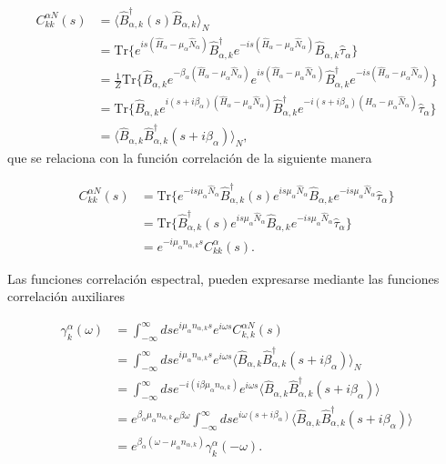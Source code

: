 \begin{appendixs}
\begin{align*}
    C^{\alpha N}_{kk}(s) & =  \langle \hat{B}^{\dagger}_{\alpha,k}(s)\hat{B}_{\alpha,k} \rangle_{N} \\
   &  = \text{Tr}\{e^{is(\hat{H}_{\alpha} - \mu_{\alpha}\hat{N}_{\alpha})}\hat{B}^{\dagger}_{\alpha,k}e^{-is(\hat{H}_{\alpha} - \mu_{\alpha}\hat{N}_{\alpha})}\hat{B}_{\alpha,k}\hat{\tau}_{\alpha}  \} \\
   & = \frac{1}{Z}\text{Tr}\{\hat{B}_{\alpha,k} e^{-\beta_{\alpha}(\hat{H}_{\alpha} - \mu_{\alpha}\hat{N}_{\alpha})} e^{is(\hat{H}_{\alpha} - \mu_{\alpha}\hat{N}_{\alpha})}\hat{B}^{\dagger}_{\alpha,k}e^{-is(\hat{H}_{\alpha} - \mu_{\alpha}\hat{N}_{\alpha})}\} \\
   & = \text{Tr}\{\hat{B}_{\alpha,k}e^{i(s+i\beta_{\alpha})(\hat{H}_{\alpha} - \mu_{\alpha}\hat{N}_{\alpha})}\hat{B}^{\dagger}_{\alpha,k}e^{-i(s+i\beta_{\alpha})(\hat{H}_{\alpha} - \mu_{\alpha}\hat{N}_{\alpha})}\hat{\tau}_{\alpha} \} \\
   & = \langle \hat{B}_{\alpha,k} \hat{B}^{\dagger}_{\alpha,k}(s+i\beta_{\alpha})\rangle_{N},
\end{align*}
que se relaciona con la función correlación de la siguiente manera 

\begin{align*}
    C^{\alpha N}_{kk}(s) & = \text{Tr}\{e^{-is\mu_{\alpha}\hat{N}_{\alpha} }\hat{B}^{\dagger}_{\alpha,k}(s)e^{is\mu_{\alpha}\hat{N}_{\alpha}} \hat{B}_{\alpha,k}e^{-is\mu_{\alpha}\hat{N}_{\alpha} }\hat{\tau}_{\alpha}   \} \\
 & = \text{Tr}\{\hat{B}^{\dagger}_{\alpha,k}(s)e^{is\mu_{\alpha}\hat{N}_{\alpha}} \hat{B}_{\alpha,k}e^{-is\mu_{\alpha}\hat{N}_{\alpha}}\hat{\tau}_{\alpha}   \}\\
 & = e^{-i\mu_{\alpha}n_{\alpha,k}s} C^{\alpha}_{kk}(s).
\end{align*}

Las funciones correlación espectral, pueden expresarse mediante las funciones correlación auxiliares

\begin{align*}
    \gamma^{\alpha}_{k}(\omega) & = \int_{-\infty}^{\infty}ds e^{i\mu_{\alpha}n_{\alpha,k}s} e^{i\omega s}C^{\alpha N}_{k,k}(s) \\
    & = \int_{-\infty}^{\infty}ds e^{i\mu_{\alpha}n_{\alpha,k}s} e^{i\omega s}\langle \hat{B}_{\alpha,k} \hat{B}^{\dagger}_{\alpha,k}(s+i\beta_{\alpha}) \rangle_{N} \\
    & = \int_{-\infty}^{\infty}ds e^{-i(i\beta \mu_{\alpha}n_{\alpha,k})} e^{i\omega s} \langle \hat{B}_{\alpha,k}\hat{B}^{\dagger}_{\alpha,k}(s+i\beta_{\alpha}) \rangle \\
    & = e^{\beta_{\alpha}\mu_{\alpha}n_{\alpha,k}}e^{\beta \omega} \int_{-\infty}^{\infty} ds e^{i\omega(s+i\beta_{\alpha})} \langle \hat{B}_{\alpha,k}\hat{B}^{\dagger}_{\alpha,k}(s+i\beta_{\alpha}) \rangle \\
    & = e^{\beta_{\alpha}(\omega - \mu_{\alpha}n_{\alpha,k})} \gamma^{\alpha}_{k}(-\omega).
\end{align*}



\end{appendixs}
